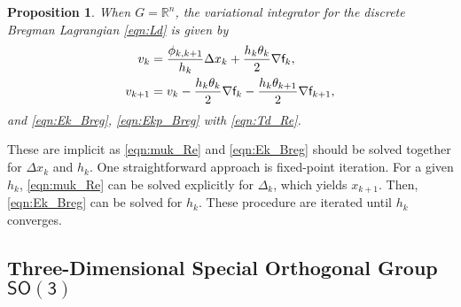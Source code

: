 \documentclass[letterpaper, 10pt, conference]{ieeeconf}
\newcommand{\SO}{\ensuremath{\mathsf{SO(3)}}}
\renewcommand{\Re}{\ensuremath{\mathbb{R}}}
\newtheorem{prop}{Proposition}
\begin{document}
\begin{prop}
    When $G=\Re^n$, the variational integrator for the discrete Bregman Lagrangian \eqref{eqn:Ld} is given by 
\begin{align}
    v_k & =  \frac{\phi_{k,k+1}}{h_k}\Delta x_k + \frac{h_k\theta_k}{2} \nabla \mathsf{f}_k,\label{eqn:muk_Re} \\
    v_{k+1} & = v_k - \frac{h_k\theta_k}{2} \nabla\mathsf{f}_k  -\frac{h_k\theta_{k+1}}{2} \nabla \mathsf{f}_{k+1},  \label{eqn:mukp_Re}
\end{align}
and \eqref{eqn:Ek_Breg}, \eqref{eqn:Ekp_Breg} with \eqref{eqn:Td_Re}.
\end{prop}
These are implicit as \eqref{eqn:muk_Re} and \eqref{eqn:Ek_Breg} should be solved together for $\Delta x_k$ and $h_k$.
One straightforward approach is fixed-point iteration.
For a given $h_k$, \eqref{eqn:muk_Re} can be solved explicitly for $\Delta_k$, which yields $x_{k+1}$. 
Then, \eqref{eqn:Ek_Breg} can be solved for $h_k$.
These procedure are iterated until $h_k$ converges. 

\subsection{Three-Dimensional Special Orthogonal Group $\SO$}
\end{document}
